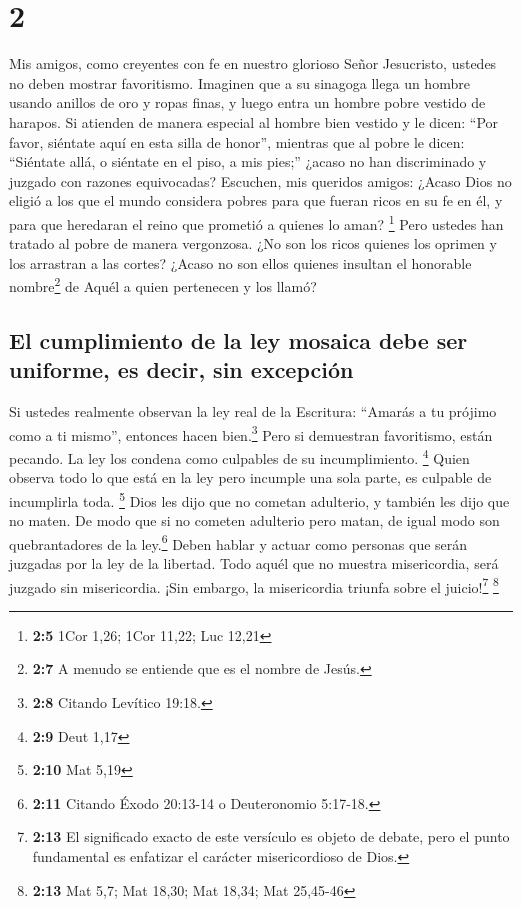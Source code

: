 \hypertarget{section-1}{%
\section{2}\label{section-1}}

 Mis amigos, como creyentes con fe en nuestro glorioso
Señor Jesucristo, ustedes no deben mostrar favoritismo. 
Imaginen que a su sinagoga llega un hombre usando anillos de oro y ropas
finas, y luego entra un hombre pobre vestido de harapos. 
Si atienden de manera especial al hombre bien vestido y le dicen: ``Por
favor, siéntate aquí en esta silla de honor'', mientras que al pobre le
dicen: ``Siéntate allá, o siéntate en el piso, a mis pies;''
 ¿acaso no han discriminado y juzgado con razones
equivocadas?  Escuchen, mis queridos amigos: ¿Acaso Dios
no eligió a los que el mundo considera pobres para que fueran ricos en
su fe en él, y para que heredaran el reino que prometió a quienes lo
aman? \footnote{\textbf{2:5} 1Cor 1,26; 1Cor 11,22; Luc 12,21}
 Pero ustedes han tratado al pobre de manera vergonzosa.
¿No son los ricos quienes los oprimen y los arrastran a las cortes?
 ¿Acaso no son ellos quienes insultan el honorable
nombre\footnote{\textbf{2:7} A menudo se entiende que es el nombre de
  Jesús.} de Aquél a quien pertenecen y los llamó?

\hypertarget{el-cumplimiento-de-la-ley-mosaica-debe-ser-uniforme-es-decir-sin-excepciuxf3n}{%
\subsection{El cumplimiento de la ley mosaica debe ser uniforme, es
decir, sin
excepción}\label{el-cumplimiento-de-la-ley-mosaica-debe-ser-uniforme-es-decir-sin-excepciuxf3n}}

 Si ustedes realmente observan la ley real de la
Escritura: ``Amarás a tu prójimo como a ti mismo'', entonces hacen
bien.\footnote{\textbf{2:8} Citando Levítico 19:18.}  Pero
si demuestran favoritismo, están pecando. La ley los condena como
culpables de su incumplimiento. \footnote{\textbf{2:9} Deut 1,17}
 Quien observa todo lo que está en la ley pero incumple
una sola parte, es culpable de incumplirla toda. \footnote{\textbf{2:10}
  Mat 5,19}  Dios les dijo que no cometan adulterio, y
también les dijo que no maten. De modo que si no cometen adulterio pero
matan, de igual modo son quebrantadores de la ley.\footnote{\textbf{2:11}
  Citando Éxodo 20:13-14 o Deuteronomio 5:17-18.}  Deben
hablar y actuar como personas que serán juzgadas por la ley de la
libertad.  Todo aquél que no muestra misericordia, será
juzgado sin misericordia. ¡Sin embargo, la misericordia triunfa sobre el
juicio!\footnote{\textbf{2:13} El significado exacto de este versículo
  es objeto de debate, pero el punto fundamental es enfatizar el
  carácter misericordioso de Dios.} \footnote{\textbf{2:13} Mat 5,7; Mat
  18,30; Mat 18,34; Mat 25,45-46}

